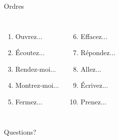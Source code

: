 \documentclass{beamer}
\begin{document}
  \begin{frame}{Ordres }
    \begin{columns}
        \begin{enumerate}
          \item Ouvrez...
          \item Écoutez...
          \item Rendez-moi...
          \item Montrez-moi...
          \item Fermez...
        \end{enumerate}
        \begin{enumerate}
          \setcounter{enumi}{5}
          \item Effacez...
          \item Répondez...
          \item Allez...
          \item Écrivez...
          \item Prenez...
        \end{enumerate}
    \end{columns}
  \end{frame}

  \begin{frame}{}
    \begin{center}
      \Large Questions?
    \end{center}
  \end{frame}
\end{document}

